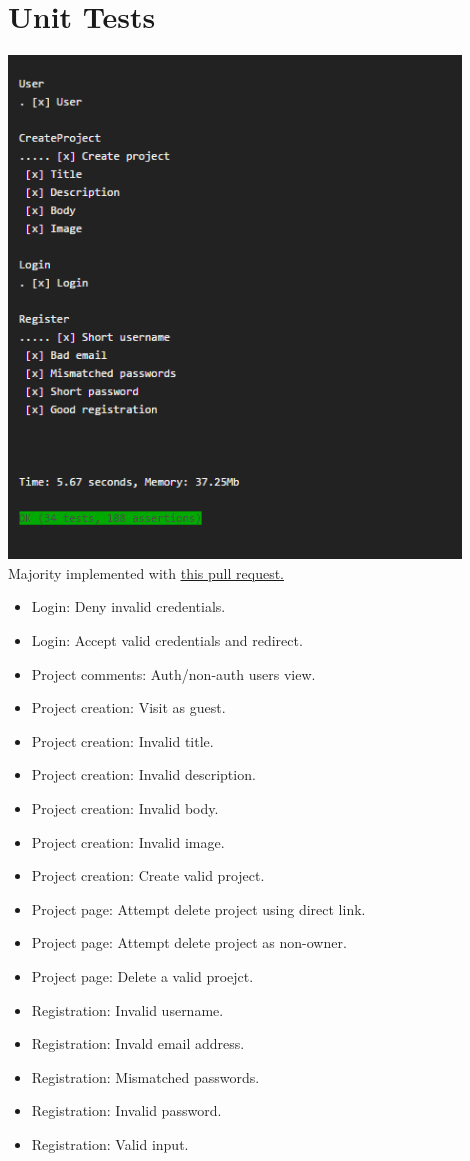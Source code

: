 \documentclass[11pt]{report}
\begin{document}
\section{Unit Tests}
    \includegraphics[width=0.9\textwidth]{images/testing} \\
    Majority implemented with \color{blue} \href{https://github.com/uidaho/squireproject/pull/75}{\underline{this pull request.}} \color{black}
    \begin{itemize}
        \item Login: Deny invalid credentials.
        \item Login: Accept valid credentials and redirect.
        \item Project comments: Auth/non-auth users view.
        \item Project creation: Visit as guest.
        \item Project creation: Invalid title.
        \item Project creation: Invalid description.
        \item Project creation: Invalid body.
        \item Project creation: Invalid image.
        \item Project creation: Create valid project.
        \item Project page: Attempt delete project using direct link.
        \item Project page: Attempt delete project as non-owner.
        \item Project page: Delete a valid proejct.
        \item Registration: Invalid username.
        \item Registration: Invald email address.
        \item Registration: Mismatched passwords.
        \item Registration: Invalid password.
        \item Registration: Valid input.
    \end{itemize}
\end{document}
